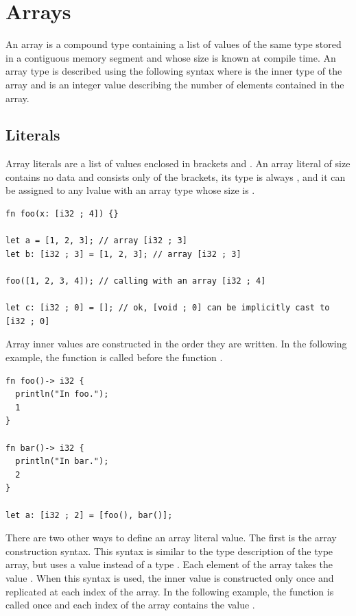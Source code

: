 \section{Arrays}%
\label{sec:compound:arrays}

 An array is a compound type containing a list of values of the same type stored
 in a contiguous memory segment and whose size is known at compile time. An
 array type is described using the following syntax \token{[T ; N]} where
  is the inner type of the array and  is an integer value
 describing the number of elements contained in the array.

\subsection{Literals}

Array literals are a list of values enclosed in brackets \token{[} and
  \token{]}. An array literal of size  contains no data and consists
only of the brackets, its type is always \token{[void ; 0]}, and it can be
assigned to any lvalue with an array type whose size is .

\begin{lstlisting}[style=coloredverbatim]
fn foo(x: [i32 ; 4]) {}

let a = [1, 2, 3]; // array [i32 ; 3]
let b: [i32 ; 3] = [1, 2, 3]; // array [i32 ; 3]

foo([1, 2, 3, 4]); // calling with an array [i32 ; 4]

let c: [i32 ; 0] = []; // ok, [void ; 0] can be implicitly cast to [i32 ; 0]
\end{lstlisting}

Array inner values are constructed in the order they are written. In the
following example, the function  is called before the function
.

\begin{lstlisting}[style=coloredverbatim]
fn foo()-> i32 {
  println("In foo.");
  1
}

fn bar()-> i32 {
  println("In bar.");
  2
}

let a: [i32 ; 2] = [foo(), bar()];
\end{lstlisting}

There are two other ways to define an array literal value. The first is the
array construction syntax. This syntax is similar to the type description of the
type array, but uses a value instead of a type \token{[V ; N]}. Each element of
the array takes the value . When this syntax is used, the inner value
is constructed only once and replicated at each index of the array. In the
following example, the function  is called once and each index of
the array contains the value .

